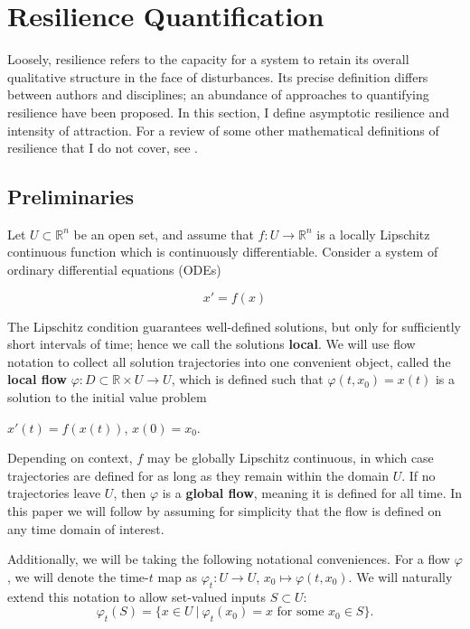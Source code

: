 \section{Resilience Quantification}
\label{sec:resilience}

Loosely, resilience refers to the capacity for a system to retain its overall qualitative structure in the face of disturbances. Its precise definition differs between authors and disciplines; an abundance of approaches to quantifying resilience have been proposed. 
%
In this section, I define asymptotic resilience and intensity of attraction. 
%
For a review of some other mathematical definitions of resilience that I do not cover, see \cite{meyerMathematicalReviewResilience2016}.


\subsection{Preliminaries}
Let $U \subset \mathbb{R}^n$ be an open set, and assume that $f : U \to \mathbb{R}^n$ is a locally Lipschitz continuous function which is continuously differentiable. Consider a system of ordinary differential equations (ODEs) 

\begin{equation}
	\label{eqn:ode}
	x' = f(x)
\end{equation}

The Lipschitz condition guarantees well-defined solutions, but only for sufficiently short intervals of time; hence we call the solutions \textbf{local}. We will use flow notation to collect all solution trajectories into one convenient object, called the \textbf{local flow} $\varphi: D \subset \mathbb{R} \times U \to U$, which is defined such that $\varphi(t,x_0) = x(t)$ is a solution to the initial value problem \begin{center}
	$x'(t) = f(x(t))$, \hspace{0.25in} $x(0) = x_0$. 
\end{center}

Depending on context, $f$ may be globally Lipschitz continuous, in which case trajectories are defined for as long as they remain within the domain $U$. If no trajectories leave $U$, then $\varphi$ is a \textbf{global flow}, meaning it is defined for all time. In this paper we will follow \cite{meyerMetricPropertiesAttractors2019} by assuming for simplicity that the flow is defined on any time domain of interest. 

Additionally, we will be taking the following notational conveniences. For a flow $\varphi$, we will denote the time-$t$ map as $\varphi_t: U \to U$, $x_0 \mapsto \varphi(t,x_0)$. We will naturally extend this notation to allow set-valued inputs $S\subset U$: $$\varphi_t(S) = \{x\in U ~| ~\varphi_t(x_0) = x \text{ for some } x_0 \in S\}.$$

